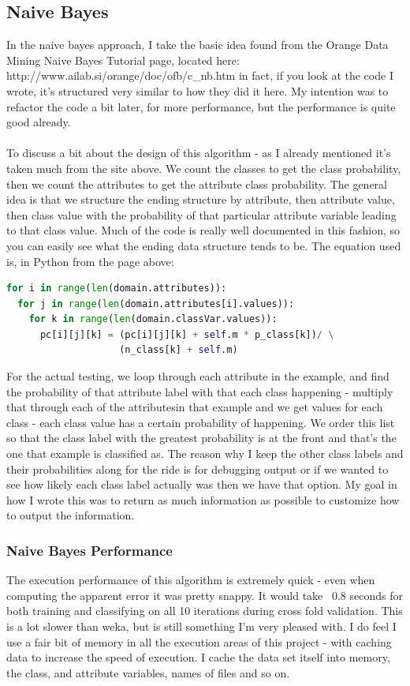 \documentclass{article}
\begin{document}
\subsection{Naive Bayes}
In the naive bayes approach, I take the basic idea found from the Orange Data Mining Naive Bayes Tutorial page, located here: http://www.ailab.si/orange/doc/ofb/c\_nb.htm in fact, if you look at the code I wrote, it's structured very similar to how they did it here.  My intention was to refactor the code a bit later, for more performance, but the performance is quite good already.\\
\\
To discuss a bit about the design of this algorithm - as I already mentioned it's taken much from the site above.  We count the classes to get the class probability, then we count the attributes to get the attribute class probability.  The general idea is that we structure the ending structure by attribute, then attribute value, then class value with the probability of that particular attribute variable leading to that class value.  Much of the code is really well documented in this fashion, so you can easily see what the ending data structure tends to be.  The equation used is, in Python from the page above:
\begin{lstlisting}[frame=single,language=python]
for i in range(len(domain.attributes)):
  for j in range(len(domain.attributes[i].values)): 
    for k in range(len(domain.classVar.values)):
      pc[i][j][k] = (pc[i][j][k] + self.m * p_class[k])/ \
                    (n_class[k] + self.m)
\end{lstlisting}
For the actual testing, we loop through each attribute in the example, and find the probability of that attribute label with that each class happening - multiply that through each of the attributesin that example and we get values for each class - each class value has a certain probability of happening.  We order this list so that the class label with the greatest probability is at the front and that's the one that example is classified as.  The reason why I keep the other class labels and their probabilities along for the ride is for debugging output or if we wanted to see how likely each class label actually was then we have that option.  My goal in how I wrote this was to return as much information as possible to customize how to output the information.
\subsubsection{Naive Bayes Performance}
The execution performance of this algorithm is extremely quick - even when computing the apparent error it was pretty snappy.  It would take ~0.8 seconds for both training and classifying on all 10 iterations during cross fold validation.  This is a lot slower than weka, but is still something I'm very pleased with.  I do feel I use a fair bit of memory in all the execution areas of this project - with caching data to increase the speed of execution.  I cache the data set itself into memory, the class, and attribute variables, names of files and so on.
\end{document}
